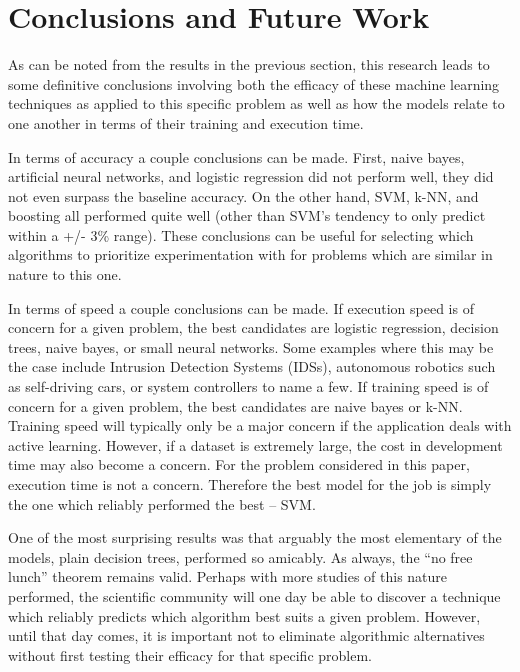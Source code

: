 \chapter{Conclusions and Future Work}
As can be noted from the results in the previous section, this research leads to some definitive conclusions involving both the efficacy of these machine learning techniques as applied to this specific problem as well as how the models relate to one another in terms of their training and execution time.

In terms of accuracy a couple conclusions can be made. First, naive bayes, artificial neural networks, and logistic regression did not perform well, they did not even surpass the baseline accuracy. On the other hand, SVM, k-NN, and boosting all performed quite well (other than SVM's tendency to only predict within a +/- 3\% range). These conclusions can be useful for selecting which algorithms to prioritize experimentation with for problems which are similar in nature to this one.

In terms of speed a couple conclusions can be made. If execution speed is of concern for a given problem, the best candidates are logistic regression, decision trees, naive bayes, or small neural networks. Some examples where this may be the case include Intrusion Detection Systems (IDSs), autonomous robotics such as self-driving cars, or system controllers to name a few. If training speed is of concern for a given problem, the best candidates are naive bayes or k-NN. Training speed will typically only be a major concern if the application deals with active learning. However, if a dataset is extremely large, the cost in development time may also become a concern. For the problem considered in this paper, execution time is not a concern. Therefore the best model for the job is simply the one which reliably performed the best -- SVM.

One of the most surprising results was that arguably the most elementary of the models, plain decision trees, performed so amicably. As always, the ``no free lunch'' theorem remains valid. Perhaps with more studies of this nature performed, the scientific community will one day be able to discover a technique which reliably predicts which algorithm best suits a given problem. However, until that day comes, it is important not to eliminate algorithmic alternatives without first testing their efficacy for that specific problem.